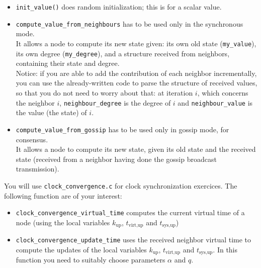 \documentclass{article}
\begin{document}
\begin{itemize}
	\item  \verb=init_value()= does random initialization; this is for a scalar value.
	\item \verb=compute_value_from_neighbours= has to be used only in the synchronous mode.\\
        It allows a node to compute its new state given: its own old state (\verb=my_value=),
        its own degree (\verb=my_degree=), and a structure received from neighbors,
        containing their state and degree.\\
        Notice: if you are able to add the
        contribution of each neighbor incrementally, you can use the
        already-written code to parse the structure of received values, so that
        you do not need to worry about that: at iteration $i$, which concerns
        the neighbor $i$, \verb=neighbour_degree= is the degree of $i$ and
        \verb=neighbour_value= is the value (the state) of $i$.
	\item \verb=compute_value_from_gossip= has to be used only in gossip mode, for consensus.\\
        It allows a node to compute its new state, given its old state and the received state
        (received from a neighbor having done the gossip broadcast transmission).
\end{itemize}

You will use \verb=clock_convergence.c= for clock synchronization exercices.
The following function are of your interest:

\begin{itemize}
	\item \verb=clock_convergence_virtual_time= computes the current virtual time of a node
        (using the local variables $k_{\text{up}}$, $t_{\text{virt},\text{up}}$ and $t_{\text{sys},\text{up}}$)
	\item \verb=clock_convergence_update_time= uses the received neighbor virtual time
        to compute the updates of the local variables
        $k_{\text{up}}$, $t_{\text{virt},\text{up}}$ and $t_{\text{sys},\text{up}}$.
        In this function you need to suitably choose parameters $\alpha$ and $q$.
\end{itemize}
\end{document}
